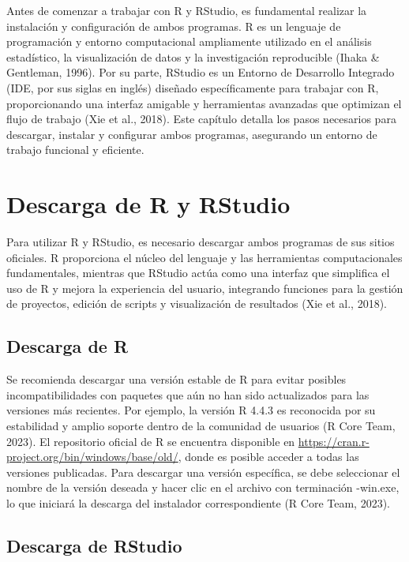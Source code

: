 \documentclass[
  spanish,
  a4paper,
  DIV=11,
  numbers=noendperiod,
  onepage,
  openany]{scrreprt}
\begin{document}
Antes de comenzar a trabajar con R y RStudio, es fundamental realizar la
instalación y configuración de ambos programas. R es un lenguaje de
programación y entorno computacional ampliamente utilizado en el
análisis estadístico, la visualización de datos y la investigación
reproducible (Ihaka \& Gentleman, 1996). Por su parte, RStudio es un
Entorno de Desarrollo Integrado (IDE, por sus siglas en inglés) diseñado
específicamente para trabajar con R, proporcionando una interfaz
amigable y herramientas avanzadas que optimizan el flujo de trabajo (Xie
et al., 2018). Este capítulo detalla los pasos necesarios para
descargar, instalar y configurar ambos programas, asegurando un entorno
de trabajo funcional y eficiente.

\section{Descarga de R y RStudio}\label{descarga-de-r-y-rstudio}

Para utilizar R y RStudio, es necesario descargar ambos programas de sus
sitios oficiales. R proporciona el núcleo del lenguaje y las
herramientas computacionales fundamentales, mientras que RStudio actúa
como una interfaz que simplifica el uso de R y mejora la experiencia del
usuario, integrando funciones para la gestión de proyectos, edición de
scripts y visualización de resultados (Xie et al., 2018).

\subsection{Descarga de R}\label{descarga-de-r}

Se recomienda descargar una versión estable de R para evitar posibles
incompatibilidades con paquetes que aún no han sido actualizados para
las versiones más recientes. Por ejemplo, la versión R 4.4.3 es
reconocida por su estabilidad y amplio soporte dentro de la comunidad de
usuarios (R Core Team, 2023). El repositorio oficial de R se encuentra
disponible en \url{https://cran.r-project.org/bin/windows/base/old/},
donde es posible acceder a todas las versiones publicadas. Para
descargar una versión específica, se debe seleccionar el nombre de la
versión deseada y hacer clic en el archivo con terminación -win.exe, lo
que iniciará la descarga del instalador correspondiente (R Core Team,
2023).

\subsection{Descarga de RStudio}\label{descarga-de-rstudio}
\end{document}
